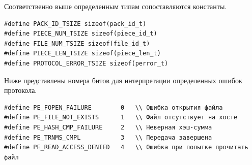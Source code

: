 Соответственно выше определенным типам сопоставляются константы.
\begin{lstlisting}
#define PACK_ID_TSIZE sizeof(pack_id_t)
#define PIECE_NUM_TSIZE sizeof(piece_id_t)
#define FILE_NUM_TSIZE sizeof(file_id_t)
#define PIECE_LEN_TSIZE sizeof(piece_len_t)
#define PROTOCOL_ERROR_TSIZE sizeof(perror_t)
\end{lstlisting}

Ниже представлены номера битов для интерпретации определенных ошибок
протокола.
\begin{lstlisting}
#define PE_FOPEN_FAILURE        0   \\ Ошибка открытия файла
#define PE_FILE_NOT_EXISTS      1   \\ Файл отсутствует на хосте
#define PE_HASH_CMP_FAILURE     2   \\ Неверная хэш-сумма
#define PE_TRNMS_CMPL           3   \\ Передача завершена
#define PE_READ_ACCESS_DENIED   4   \\ Ошибка при попытке прочитать файл
\end{lstlisting}

